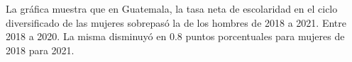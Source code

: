 La gráfica muestra que en Guatemala, la tasa neta de escolaridad en el ciclo diversificado de las mujeres sobrepasó la de los hombres de 2018 a 2021. Entre 2018 a 2020. La misma disminuyó en 0.8 puntos porcentuales para mujeres de 2018 para 2021.